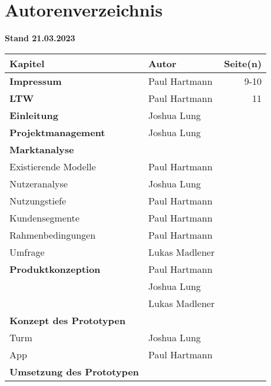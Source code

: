 \section{Autorenverzeichnis}

\textbf{Stand 21.03.2023}

\begin{longtable}{llr}
  \textbf{Kapitel}                  & \textbf{Autor} & \textbf{Seite(n)} \\
  \toprule
  \textbf{Impressum}                & Paul Hartmann  &  9-10               \\
  \midrule
  \textbf{LTW}                      & Paul Hartmann  &  11               \\
  \midrule
  \textbf{Einleitung}               & Joshua Lung    &                 \\
  \midrule
  \textbf{Projektmanagement}        & Joshua Lung    &                 \\
  \midrule
  \textbf{Marktanalyse}             &                &                 \\
  Existierende Modelle              & Paul Hartmann  &                 \\
  Nutzeranalyse                     & Joshua Lung    &                 \\
  Nutzungstiefe                     & Paul Hartmann  &                 \\
  Kundensegmente                    & Paul Hartmann  &                 \\
  Rahmenbedingungen                 & Paul Hartmann  &                 \\
  Umfrage                           & Lukas Madlener &                 \\
  \midrule
  \textbf{Produktkonzeption}        & Paul Hartmann  &                 \\
                                    & Joshua Lung    &                 \\
                                    & Lukas Madlener &                 \\
  \midrule
  \textbf{Konzept des Prototypen}   &                &                 \\
  Turm                              & Joshua Lung    &                 \\
  App                               & Paul Hartmann  &                 \\
  \midrule
  \textbf{Umsetzung des Prototypen} &                &                 \\

\end{longtable}
